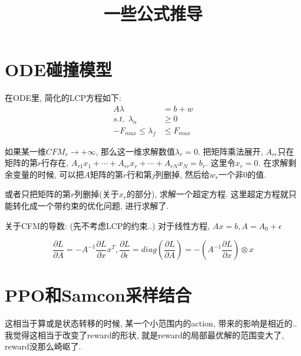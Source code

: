 \documentclass{article}
\title{一些公式推导}
\begin{document}
 	\maketitle
 	
 	\section{ODE碰撞模型}
 	在ODE里, 简化的LCP方程如下:
 	\begin{equation}
 		\begin{aligned}
 		A \lambda &= b + w \\
 		s.t. \ \ \lambda_n &\geq 0 \\
 		-F_{max} \leq \lambda_f &\leq F_{max}
 		\end{aligned}
 	\end{equation}
 
 	如果某一维$CFM_r \to +\infty$, 那么这一维求解数值$\lambda_r = 0$. 
 	把矩阵乘法展开, $A_{rr}$只在矩阵的第$r$行存在, $A_{r1} x_1 + \cdots + A_{rr}x_{r} + \cdots + A_{rN} x_{N} = b_{r}$. 这里令$x_r = 0$. 在求解剩余变量的时候, 可以把$A$矩阵的第$r$行和第$j$列删掉, 然后给$w_r$一个非0的值.
 	
 	或者只把矩阵的第$r$列删掉(关于$x_r$的部分), 求解一个超定方程.
 	这里超定方程就只能转化成一个带约束的优化问题, 进行求解了.
 	
 	关于CFM的导数: (先不考虑LCP的约束..) 对于线性方程, $A x = b, A = A_0 + \epsilon$

	\begin{equation}
		\frac{\partial L}{\partial A} = -A^{-1} \frac{\partial L}{\partial x} x^T, \frac{\partial L}{\partial \epsilon} = diag(\frac{\partial L}{\partial A}) = - (A^{-1} \frac{\partial L}{\partial x}) \otimes x
	\end{equation}

	\section{PPO和Samcon采样结合}
	这相当于算或是状态转移的时候, 某一个小范围内的action, 带来的影响是相近的..
	我觉得这相当于改变了reward的形状, 就是reward的局部最优解的范围变大了, reward没那么崎岖了.
 
\end{document}
